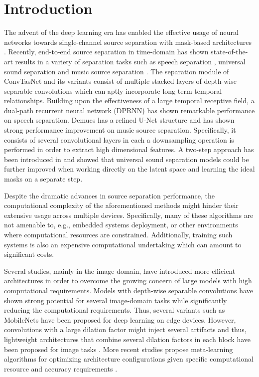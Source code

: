 \section{Introduction}
\label{sec:intro}


The advent of the deep learning era has enabled the effective usage of neural networks towards single-channel source separation with mask-based architectures \cite{huang2014deep}. Recently, end-to-end source separation in time-domain has shown state-of-the-art results in a variety of separation tasks such as speech separation \cite{luo2019convTasNet,luo2019dual}, universal sound separation \cite{kavalerov2019universal,tzinis2019improving} and music source separation \cite{defossez2019demucs}. The separation module of ConvTasNet \cite{luo2019convTasNet} and its variants \cite{kavalerov2019universal,tzinis2019improving} consist of multiple stacked layers of depth-wise separable convolutions \cite{sifre2014depthwiseseparable} which can aptly incorporate long-term temporal relationships. Building upon the effectiveness of a large temporal receptive field, a dual-path recurrent neural network (DPRNN) \cite{luo2019dual} has shown remarkable performance on speech separation. Demucs \cite{defossez2019demucs} has a refined U-Net structure \cite{ronneberger2015original_unet} and has shown strong performance improvement on music source separation. Specifically, it consists of several convolutional layers in each a downsampling operation is performed in order to extract high dimensional features. A two-step approach has been introduced in \cite{tzinis2019two} and showed that universal sound separation models could be further improved when working directly on the latent space and learning the ideal masks on a separate step.

Despite the dramatic advances in source separation performance, the computational complexity of the aforementioned methods might hinder their extensive usage across multiple devices. Specifically, many of these algorithms are not amenable to, e.g., embedded systems deployment, or other environments where computational resources are constrained.  Additionally, training such systems is also an expensive computational undertaking which can amount to significant costs.

Several studies, mainly in the image domain, have introduced more efficient architectures in order to overcome the growing concern of large models with high computational requirements. Models with depth-wise separable convolutions \cite{sifre2014depthwiseseparable} have shown strong potential for several image-domain tasks \cite{chollet2017xception_depthwiseseparable} while significantly reducing the computational requirements. Thus, several variants such as MobileNets \cite{howard2017mobilenets} have been proposed for deep learning on edge devices. However, convolutions with a large dilation factor might inject several artifacts and thus, lightweight architectures that combine several dilation factors in each block have been proposed for image tasks \cite{mehta2019espnetv2}. More recent studies propose meta-learning algorithms for optimizing architecture configurations given specific computational resource and accuracy requirements \cite{yu2019slimmablenets,cai2019onceandforall}.

